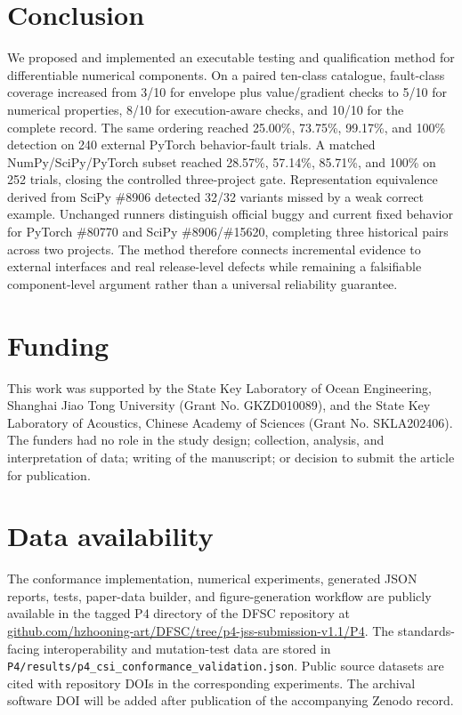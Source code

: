 \documentclass[preprint,12pt]{elsarticle}
\begin{document}
\section{Conclusion}
We proposed and implemented an executable testing and qualification method for differentiable numerical components. On a paired ten-class catalogue, fault-class coverage increased from 3/10 for envelope plus value/gradient checks to 5/10 for numerical properties, 8/10 for execution-aware checks, and 10/10 for the complete record. The same ordering reached 25.00\%, 73.75\%, 99.17\%, and 100\% detection on 240 external PyTorch behavior-fault trials. A matched NumPy/SciPy/PyTorch subset reached 28.57\%, 57.14\%, 85.71\%, and 100\% on 252 trials, closing the controlled three-project gate. Representation equivalence derived from SciPy \#8906 detected 32/32 variants missed by a weak correct example. Unchanged runners distinguish official buggy and current fixed behavior for PyTorch \#80770 and SciPy \#8906/\#15620, completing three historical pairs across two projects. The method therefore connects incremental evidence to external interfaces and real release-level defects while remaining a falsifiable component-level argument rather than a universal reliability guarantee.

\section*{Funding}
This work was supported by the State Key Laboratory of Ocean Engineering, Shanghai Jiao Tong University (Grant No. GKZD010089), and the State Key Laboratory of Acoustics, Chinese Academy of Sciences (Grant No. SKLA202406). The funders had no role in the study design; collection, analysis, and interpretation of data; writing of the manuscript; or decision to submit the article for publication.

\section*{Data availability}
The conformance implementation, numerical experiments, generated JSON reports, tests, paper-data builder, and figure-generation workflow are publicly available in the tagged P4 directory of the DFSC repository at \href{https://github.com/hzhooning-art/DFSC/tree/p4-jss-submission-v1.1/P4}{github.com/hzhooning-art/DFSC/tree/p4-jss-submission-v1.1/P4}. The standards-facing interoperability and mutation-test data are stored in \texttt{P4/results/p4\_csi\_conformance\_validation.json}. Public source datasets are cited with repository DOIs in the corresponding experiments. The archival software DOI will be added after publication of the accompanying Zenodo record.
\end{document}
